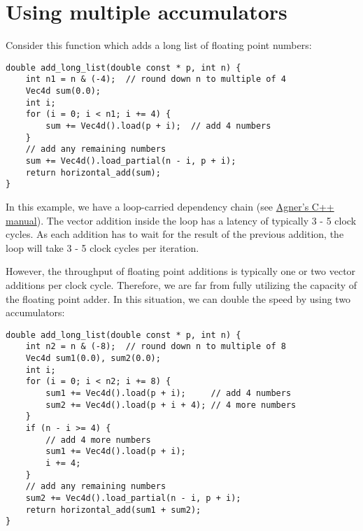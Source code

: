 \documentclass[vcl_manual.tex]{subfiles}
\begin{document}
\section{Using multiple accumulators} \label{UsingMultipleAccumulators}

Consider this function which adds a long list of floating point numbers:

\begin{example}
\label{exampleLoopAccumulator1}
\end{example}
\begin{lstlisting}[frame=single]
double add_long_list(double const * p, int n) {
    int n1 = n & (-4);  // round down n to multiple of 4
    Vec4d sum(0.0);
    int i;
    for (i = 0; i < n1; i += 4) {
        sum += Vec4d().load(p + i);  // add 4 numbers
    }
    // add any remaining numbers
    sum += Vec4d().load_partial(n - i, p + i);
    return horizontal_add(sum);
}
\end{lstlisting}

In this example, we have a loop-carried dependency chain (see
\href{https://www.agner.org/optimize/#manual_cpp}{Agner's C++ manual}). 
The vector addition inside the loop has a latency of typically 3 - 5 clock cycles. As each addition has to wait for the result of the previous addition, the loop will take 3 - 5 clock cycles per iteration.

However, the throughput of floating point additions is typically one or two vector additions per clock cycle. Therefore, we are far from fully utilizing the capacity of the floating point adder. In this situation, we can double the speed by using two accumulators:

\begin{example}
\label{exampleLoopAccumulator2}
\end{example}
\begin{lstlisting}[frame=single]
double add_long_list(double const * p, int n) {
    int n2 = n & (-8);  // round down n to multiple of 8
    Vec4d sum1(0.0), sum2(0.0);
    int i;
    for (i = 0; i < n2; i += 8) {
        sum1 += Vec4d().load(p + i);     // add 4 numbers
        sum2 += Vec4d().load(p + i + 4); // 4 more numbers
    }
    if (n - i >= 4) {
        // add 4 more numbers
        sum1 += Vec4d().load(p + i);
        i += 4;
    }
    // add any remaining numbers
    sum2 += Vec4d().load_partial(n - i, p + i);
    return horizontal_add(sum1 + sum2);
}
\end{lstlisting}
\end{document}
